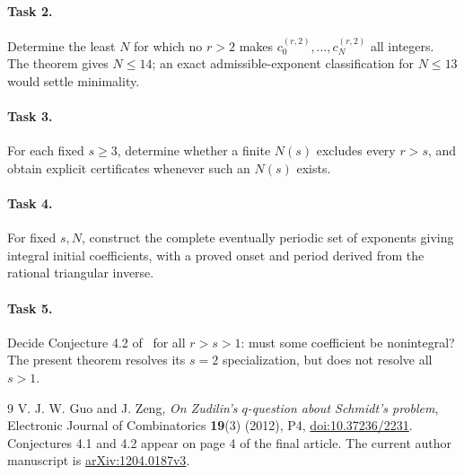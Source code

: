 \documentclass[11pt]{article}
\begin{document}
\paragraph{Task 2.} Determine the least $N$ for which no $r>2$ makes
$c_0^{(r,2)},\ldots,c_N^{(r,2)}$ all integers. The theorem gives $N\le14$;
an exact admissible-exponent classification for $N\le13$ would settle
minimality.
\paragraph{Task 3.} For each fixed $s\ge3$, determine whether a finite
$N(s)$ excludes every $r>s$, and obtain explicit certificates whenever
such an $N(s)$ exists.
\paragraph{Task 4.} For fixed $s,N$, construct the complete eventually
periodic set of exponents giving integral initial coefficients, with a
proved onset and period derived from the rational triangular inverse.
\paragraph{Task 5.} Decide Conjecture 4.2 of~\cite{GZ} for all $r>s>1$:
must some coefficient be nonintegral? The present theorem resolves its
$s=2$ specialization, but does not resolve all $s>1$.

\begin{thebibliography}{9}
 V. J. W. Guo and J. Zeng,
\emph{On Zudilin's $q$-question about Schmidt's problem},
Electronic Journal of Combinatorics \textbf{19}(3) (2012), P4,
\href{https://doi.org/10.37236/2231}{doi:10.37236/2231}.
Conjectures 4.1 and 4.2 appear on page 4 of the final article.
The current author manuscript is
\href{https://arxiv.org/abs/1204.0187v3}{arXiv:1204.0187v3}.
\end{thebibliography}
\end{document}
